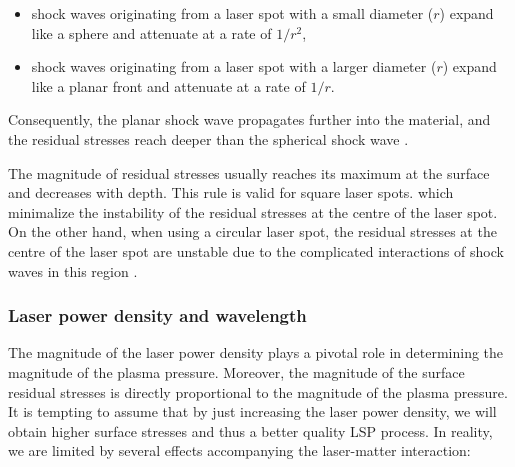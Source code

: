 \begin{itemize}

    \item shock waves originating from a laser spot with a small diameter (\(r\)) expand like a sphere and attenuate at a rate of \(1/r^2\),

    \item shock waves originating from a laser spot with a larger diameter (\(r\))  expand like a planar front and attenuate at a rate of \(1/r\).

\end{itemize}

Consequently, the planar shock wave propagates further into the material, and the residual stresses reach deeper than the spherical shock wave \cite{bolger_montross_rode_1999}. 

The magnitude of residual stresses usually reaches its maximum at the surface and decreases with depth. This rule is valid for square laser spots. which minimalize the instability of the residual stresses at the centre of the laser spot. On the other hand, when using a circular laser spot, the residual stresses at the centre of the laser spot are unstable due to the complicated interactions of shock waves in this region \cite{masse_barreau_1995}. 

\subsubsection*{Laser power density and wavelength}

The magnitude of the laser power density plays a pivotal role in determining the magnitude of the plasma pressure. Moreover, the magnitude of the surface residual stresses is directly proportional to the magnitude of the plasma pressure. It is tempting to assume that by just increasing the laser power density, we will obtain higher surface stresses and thus a better quality LSP process. In reality, we are limited by several effects accompanying the laser-matter interaction:

